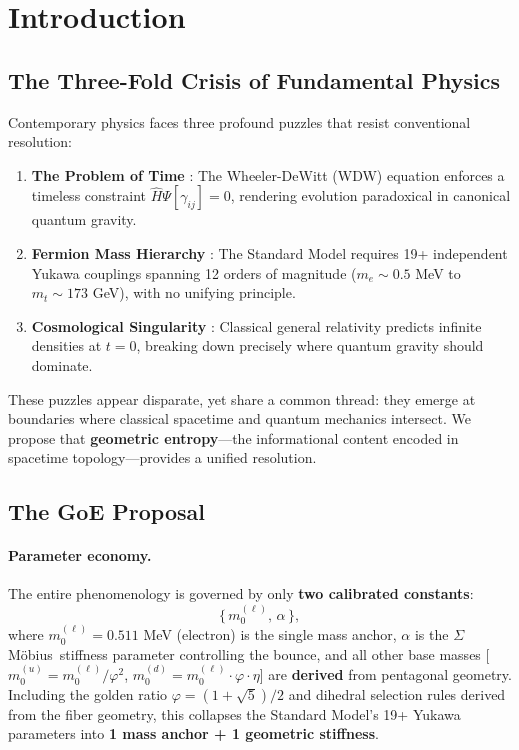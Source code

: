 \documentclass[12pt]{article}
\theoremstyle{definition}
\theoremstyle{plain}
\newcommand{\Moebius}{M\"obius}
\newcommand{\SigMoeb}{\ensuremath{\Sigma}\text{--}\Moebius}
\begin{document}
\clearpage

\section{Introduction}

\subsection{The Three-Fold Crisis of Fundamental Physics}

Contemporary physics faces three profound puzzles that resist conventional resolution:

\begin{enumerate}
\item \textbf{The Problem of Time} \cite{wheeler1968}: The Wheeler-DeWitt (WDW) equation enforces a timeless constraint $\hat{H} \Psi[\gamma_{ij}] = 0$, rendering evolution paradoxical in canonical quantum gravity.

\item \textbf{Fermion Mass Hierarchy} \cite{pdg2024}: The Standard Model requires 19+ independent Yukawa couplings spanning 12 orders of magnitude ($m_e \sim 0.5$ MeV to $m_t \sim 173$ GeV), with no unifying principle.

\item \textbf{Cosmological Singularity} \cite{hawking1970}: Classical general relativity predicts infinite densities at $t = 0$, breaking down precisely where quantum gravity should dominate.
\end{enumerate}

These puzzles appear disparate, yet share a common thread: they emerge at boundaries where classical spacetime and quantum mechanics intersect. We propose that \textbf{geometric entropy}—the informational content encoded in spacetime topology—provides a unified resolution.

\subsection{The GoE Proposal}

\paragraph{Parameter economy.} The entire phenomenology is governed by only \textbf{two calibrated constants}:
\begin{equation}
\{\,m_{0}^{(\ell)},\,\alpha\,\},
\end{equation}
where $m_0^{(\ell)} = 0.511$ MeV (electron) is the single mass anchor, $\alpha$ is the \SigMoeb\ stiffness parameter controlling the bounce, and all other base masses [$m_0^{(u)} = m_0^{(\ell)}/\varphi^2$, $m_0^{(d)} = m_0^{(\ell)} \cdot \varphi \cdot \eta$] are \textbf{derived} from pentagonal geometry. Including the golden ratio $\varphi=(1+\sqrt{5})/2$ and dihedral selection rules derived from the fiber geometry, this collapses the Standard Model's 19+ Yukawa parameters into \textbf{1 mass anchor + 1 geometric stiffness}.
\end{document}
